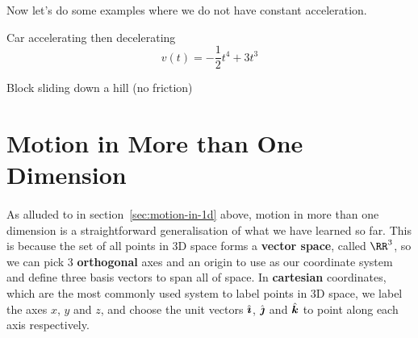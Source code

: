\documentclass[../classical_mechanics.tex]{subfiles}
\begin{document}
        Now let's do some examples where we do not have constant acceleration.
        \begin{example}
            Car accelerating then decelerating %
            \begin{equation*}
                v(t)=-\frac{1}{2}t^4+3t^3
            \end{equation*}
        \end{example}
        \begin{example}
            Block sliding down a hill (no friction) %
        \end{example}

    \section{Motion in More than One Dimension}\label{sec:motion-in-2-3d}
        \paragraph{}
        As alluded to in section~\ref{sec:motion-in-1d} above, motion in more than one dimension is a straightforward generalisation of what we have learned so far.
        This is because the set of all points in 3D space forms a \textbf{vector space}, called $\RR^3$, so we can pick 3 \textbf{orthogonal} axes and an origin to use as our coordinate system and define three basis vectors to span all of space.
        In \textbf{cartesian} coordinates, which are the most commonly used system to label points in 3D space, we label the axes $x$, $y$ and $z$, and choose the unit vectors $\hat{\boldsymbol{\imath}}$, $\hat{\boldsymbol{\jmath}}$ and $\hat{\boldsymbol{k}}$ to point along each axis respectively.
        \begin{figure}[H]
            \centering
        \end{figure}
\end{document}
